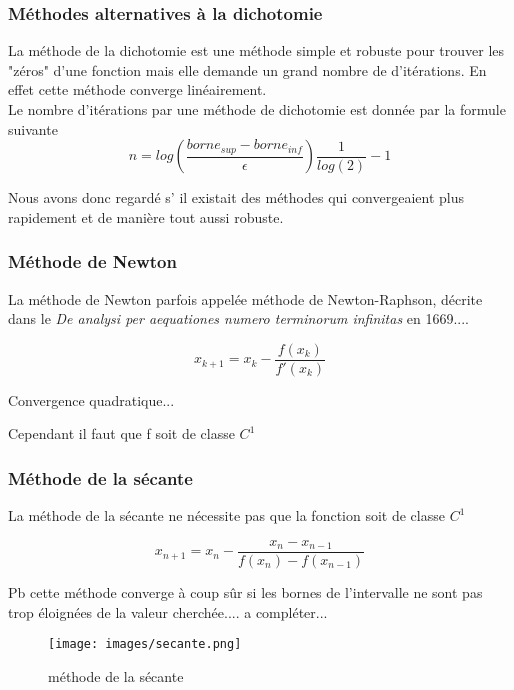 \subsubsection{Méthodes alternatives à la dichotomie}
La méthode de la dichotomie est une méthode simple et robuste pour trouver les "zéros" d'une fonction mais elle demande un grand nombre de d'itérations. En effet cette méthode converge linéairement.
\\
[A VERIFIER]
Le nombre d'itérations par une méthode de dichotomie est donnée par la formule suivante
\begin{equation}
n = log(\frac{borne_{sup} - borne_{inf}}{\epsilon}) \frac{1}{log(2)} - 1
\end{equation}

Nous avons donc regardé s' il existait des méthodes qui convergeaient plus rapidement et de manière tout aussi robuste. 

\subsubsection{Méthode de Newton}
La méthode de Newton parfois appelée méthode de Newton-Raphson, décrite dans le \textit{De analysi per aequationes numero terminorum infinitas} en 1669....

\begin{equation}
x_{k+1} = x_k - \frac{f(x_k)}{f'(x_k)}
\end{equation}

Convergence quadratique...

Cependant il faut que f soit de classe $C^1$
\\
\subsubsection{Méthode de la sécante}

La méthode de la sécante ne nécessite pas que la fonction soit de classe $C^1$


\begin{equation}
x_{n+1} = x_n - \frac{x_n - x_{n-1}}{f(x_n) - f(x_{n-1})}
\end{equation}

Pb cette méthode converge à coup sûr si les bornes de l'intervalle ne sont pas trop éloignées de la valeur cherchée....
a compléter...

\begin{figure}[htb!]
	\centering
	\texttt{[image: images/secante.png]}
	\caption{méthode de la sécante}
	\label{Fig::bench}
\end{figure}
\FloatBarrier


